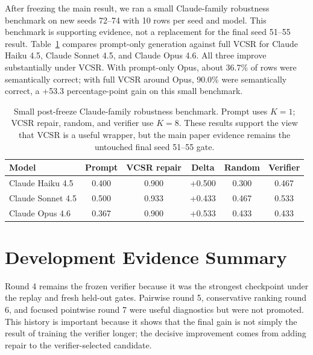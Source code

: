 \documentclass[11pt]{article}
\newcommand{\vcsr}{\textsc{VCSR}\xspace}
\begin{document}
After freezing the main result, we ran a small Claude-family robustness
benchmark on new seeds 72--74 with 10 rows per seed and model. This benchmark is
supporting evidence, not a replacement for the final seed 51--55 result.
Table~\ref{tab:modelbench} compares prompt-only generation against full \vcsr
for Claude Haiku 4.5, Claude Sonnet 4.5, and Claude Opus 4.6. All three improve
substantially under \vcsr. With prompt-only Opus, about 36.7\% of rows were
semantically correct; with full \vcsr around Opus, 90.0\% were semantically
correct, a +53.3 percentage-point gain on this small benchmark.

\begin{table}[t]
\centering
\footnotesize
\setlength{\tabcolsep}{3pt}
\begin{tabular}{@{}lccccc@{}}
\toprule
Model & Prompt & \vcsr repair & Delta & Random & Verifier \\
\midrule
Claude Haiku 4.5 & 0.400 & 0.900 & +0.500 & 0.300 & 0.467 \\
Claude Sonnet 4.5 & 0.500 & 0.933 & +0.433 & 0.467 & 0.533 \\
Claude Opus 4.6 & 0.367 & 0.900 & +0.533 & 0.433 & 0.433 \\
\bottomrule
\end{tabular}
\caption{Small post-freeze Claude-family robustness benchmark. Prompt uses
$K=1$; \vcsr repair, random, and verifier use $K=8$. These results support the
view that \vcsr is a useful wrapper, but the main paper evidence remains the
untouched final seed 51--55 gate.}
\label{tab:modelbench}
\end{table}

\section{Development Evidence Summary}

Round 4 remains the frozen verifier because it was the strongest checkpoint
under the replay and fresh held-out gates. Pairwise round 5, conservative
ranking round 6, and focused pointwise round 7 were useful diagnostics but were
not promoted. This history is important because it shows that the final gain is
not simply the result of training the verifier longer; the decisive improvement
comes from adding repair to the verifier-selected candidate.



\end{document}

